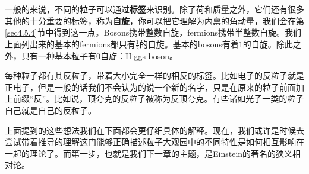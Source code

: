 一般的来说，不同的粒子可以通过{\bf 标签}来识别。除了荷和质量之外，它们还有很多其他的十分重要的标签，称为{\bf 自旋}，你可以把它理解为内禀的角动量，我们会在第\ref{sec4.5.4}节中得到这一点。Bosons携带整数自旋，fermions携带半整数自旋。我们上面列出来的基本的fermions都只有$\tfrac{1}{2}$的自旋。基本的bosons有着$1$的自旋。除此之外，只有一种基本粒子有$0$自旋：Higgs boson。

每种粒子都有其反粒子，带着大小完全一样的相反的标签。比如电子的反粒子就是正电子，但是一般的话我们不会认为的说一个新的名字，只是在原来的粒子前面加上前缀``反''。比如说，顶夸克的反粒子被称为反顶夸克。有些诸如光子一类的粒子自己就是自己的反粒子。

上面提到的这些想法我们在下面都会更仔细具体的解释。现在，我们或许是时候去尝试带着推导的理解这门能够正确描述粒子大观园中的不同特性是如何相互影响在一起的理论了。而第一步，也就是我们下一章的主题，是Einstein的著名的狭义相对论。



